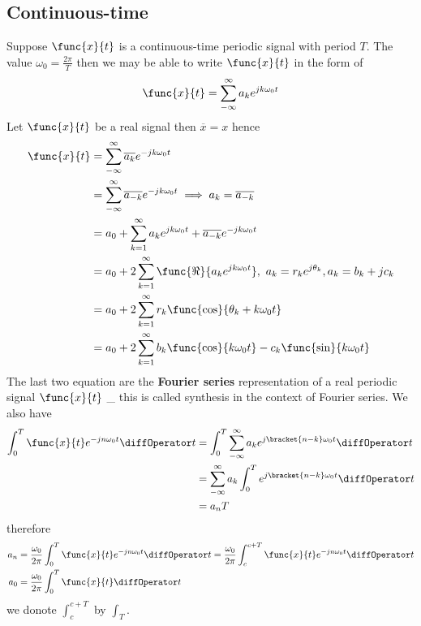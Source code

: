 \subsection{Continuous-time}
Suppose \(\func{x}{t}\) is a continuous-time periodic signal with period \(T\). The value \(\omega_0 = \frac{2\pi}{T}\) then we may be able to write \(\func{x}{t}\) in the form of 
\begin{equation*}
    \func{x}{t} = \sum_{-\infty}^{\infty} a_k e^{jk\omega_0 t}
\end{equation*}
Let \(\func{x}{t}\) be a real signal then \(\overline{x} = x\) hence 
\begin{align*}
    \func{x}{t} &= \sum_{-\infty}^{\infty} \overline{a_k} e^{-jk\omega_0 t}\\
    &=  \sum_{-\infty}^{\infty} \overline{a_{-k}} e^{-jk\omega_0 t} \implies a_k = \overline{a_{-k}}\\
    &= a_0 +\sum_{k = 1}^{\infty} a_k e^{jk\omega_0 t} + \overline{a_{-k}} e^{-jk\omega_0 t} \\
    &= a_0 + 2 \sum_{k = 1}^{\infty}  \func{\Re}{a_k e^{jk\omega_0 t}}, \ a_k = r_k e^{j\theta_k} , a_k = b_k + jc_k\\
    &= a_0 + 2 \sum_{k = 1}^{\infty}  r_k \func{\cos}{\theta_k + k \omega_0 t}\\
    &=  a_0 + 2 \sum_{k = 1}^{\infty}  b_k \func{\cos}{k \omega_0 t} - c_k \func{\sin}{k \omega_0 t}\\
\end{align*}
The last two equation are the \textbf{Fourier series} representation of a real periodic signal \(\func{x}{t}\) \_ this is called synthesis in the context of Fourier series. We also have 
\begin{align*}
    \int_{0}^T \func{x}{t} e^{-jn\omega_0 t} \diffOperator t &= \int_{0}^T \sum_{-\infty}^{\infty} a_k e^{j\bracket{n-k }\omega_0 t}\diffOperator t\\
    &=\sum_{-\infty}^{\infty} a_k \int_{0}^T  e^{j\bracket{n-k }\omega_0 t}\diffOperator t\\
    &= a_n T
\end{align*} 
therefore 
\begin{align*}
    a_n &= \dfrac{\omega_0}{2\pi}  \int_{0}^T \func{x}{t} e^{-jn\omega_0 t} \diffOperator t = \dfrac{\omega_0}{2\pi} \int_{c}^{c +T} \func{x}{t} e^{-jn\omega_0 t} \diffOperator t\\
    a_0 &= \dfrac{\omega_0}{2\pi}  \int_{0}^T \func{x}{t} \diffOperator t 
\end{align*}
we donote \(\int_{c}^{c + T}\) by \(\int_T\).

